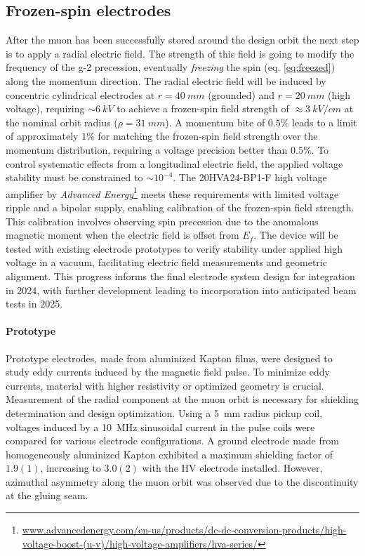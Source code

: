 \begin{refsection}
    \subsection{Frozen-spin electrodes}
        After the muon has been successfully stored around the design orbit the next step is to apply a radial electric field. 
        The strength of this field is going to modify the frequency of the g-2 precession, eventually \textit{freezing} the spin (eq. \ref{eq:freezed}) along the momentum direction.
        The radial electric field will be induced by concentric cylindrical electrodes at $r=\SI{40}{mm}$ (grounded) and $r=\SI{20}{mm}$ (high voltage), requiring $\sim\SI{6}{kV}$ to achieve a frozen-spin field strength of $\approx\SI{3}{kV\per cm}$ at the nominal orbit radius ($\rho=\SI{31}{mm}$).
        A momentum bite of $0.5\%$ leads to a limit of approximately $1\%$ for matching the frozen-spin field strength over the momentum distribution, requiring a voltage precision better than $0.5\%$. 
        To control systematic effects from a longitudinal electric field, the applied voltage stability must be constrained to $\sim10^{-4}$.
        The 20HVA24-BP1-F high voltage amplifier by \textit{Advanced Energy}\footnote{\url{www.advancedenergy.com/en-us/products/dc-dc-conversion-products/high-voltage-boost-(u-v)/high-voltage-amplifiers/hva-series/}} meets these requirements with limited voltage ripple and a bipolar supply, enabling calibration of the frozen-spin field strength. 
        This calibration involves observing spin precession due to the anomalous magnetic moment when the electric field is offset from $E_f$. 
        The device will be tested with existing electrode prototypes to verify stability under applied high voltage in a vacuum, facilitating electric field measurements and geometric alignment. 
        This progress informs the final electrode system design for integration in 2024, with further development leading to incorporation into anticipated beam tests in 2025.

        \paragraph{Prototype}
        Prototype electrodes, made from aluminized Kapton films, were designed to study eddy currents induced by the magnetic field pulse. 
        To minimize eddy currents, material with higher resistivity or optimized geometry is crucial. 
        Measurement of the radial component at the muon orbit is necessary for shielding determination and design optimization.
        Using a \SI{5}{mm} radius pickup coil, voltages induced by a \SI{10}{\mega\hertz} sinusoidal current in the pulse coils were compared for various electrode configurations. 
        A ground electrode made from homogeneously aluminized Kapton exhibited a maximum shielding factor of $1.9(1)$, increasing to $3.0(2)$ with the HV electrode installed. 
        However, azimuthal asymmetry along the muon orbit was observed due to the discontinuity at the gluing seam.
        

\end{refsection}
